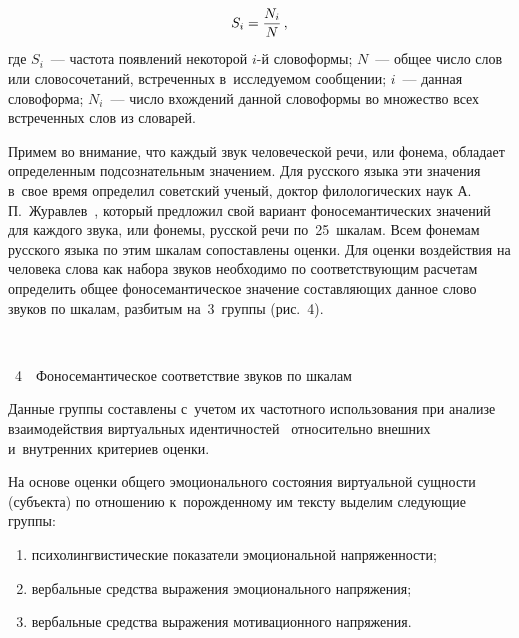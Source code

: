 \begin{multicols}{2}
\noindent
  \begin{equation}
  S_i=\displaystyle\frac{\displaystyle N_i\mathstrut}{\displaystyle N\mathstrut}\,,
  \label{e1-sig}
  \end{equation}
где $S_i$~--- частота появлений некоторой $i$-й словоформы; $N$~--- общее 
число слов или словосочетаний, встреченных в~исследуемом сообщении; $i$~--- 
данная словоформа; $N_i$~--- число вхождений данной словоформы во 
множество всех встреченных слов из словарей.
  
  Примем во внимание, что каждый звук человеческой речи, или фонема, 
обладает определенным подсознательным значением. Для русского языка эти 
значения в~свое время определил советский ученый, доктор филологических 
наук А.\,П.~Жу\-рав\-лев~\cite{9-sig}, который предложил свой вариант 
фоносемантических значений для каждого звука, или фонемы, русской речи 
по~25~шкалам. Всем фонемам русского языка по этим шкалам сопоставлены 
оценки. Для оценки воздействия на человека слова как набора звуков 
необходимо по со\-от\-вет\-ст\-ву\-ющим расчетам определить общее 
фоносемантическое значение составляющих данное слово звуков по шкалам, 
разбитым на~3~группы (рис.~4).

 { \begin{center}  %
 \vspace*{6pt}
\mbox{%
\epsfxsize=77.449mm
}

\end{center}


\noindent
{{\figurename~4}\ \ \small{Фоносемантическое соответствие звуков по шкалам}}

}

\vspace*{9pt}

\addtocounter{figure}{1} 
  
 
  
  Данные группы составлены с~учетом их час\-тот\-но\-го использования при 
анализе взаимодействия виртуальных идентичностей~\cite{10-sig} 
относительно внешних и~внутренних критериев оценки.
  
  На основе оценки общего эмоционального состояния виртуальной сущности 
(субъекта) по отношению к~порожденному им тексту выделим следующие 
группы: 
  \begin{enumerate}[(1)]
  \item  психолингвистические показатели эмоциональной напряженности; 
  \item вербальные средства выражения эмоционального напряжения; 
  \item вербальные средства выражения мотивационного напряжения.
  \end{enumerate}
  

\end{multicols}
